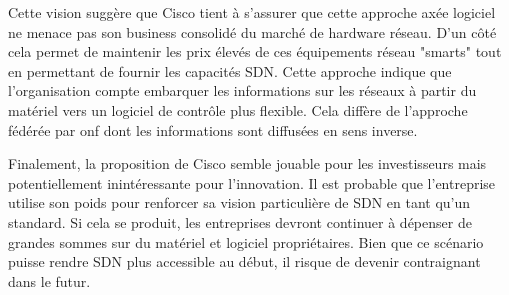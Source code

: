 Cette vision suggère que Cisco tient à s'assurer que cette approche axée logiciel ne menace pas son business consolidé du marché de hardware réseau. D'un côté cela permet de maintenir les prix élevés de ces équipements réseau "smarts" tout en permettant de fournir les capacités SDN. Cette approche indique que l'organisation compte embarquer les informations sur les réseaux à partir du matériel vers un logiciel de contrôle plus flexible. Cela diffère de l'approche fédérée par \gls{onf} dont les informations sont diffusées en sens inverse. 



Finalement, la proposition de Cisco semble jouable pour les investisseurs mais potentiellement inintéressante pour l'innovation. Il est probable que l'entreprise utilise son poids pour renforcer sa vision particulière de SDN en tant qu'un standard. Si cela se produit, les entreprises devront continuer à dépenser de grandes sommes sur du matériel et logiciel propriétaires. Bien que ce scénario puisse rendre SDN plus accessible au début, il risque de devenir contraignant dans le futur. \cite{ExecutiveGuideToSDNCisco}




